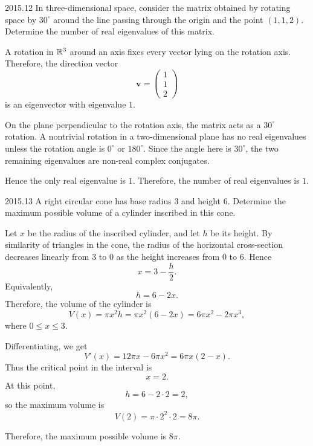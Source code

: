     \begin{pastproblem}{2015.12}
        In three-dimensional space, consider the matrix obtained by rotating space by $30^\circ$
        around the line passing through the origin and the point $(1,1,2)$. Determine the number of
        real eigenvalues of this matrix.
    \end{pastproblem}

    \begin{solution}
        A rotation in $\mathbb{R}^3$ around an axis fixes every vector lying on the rotation axis.
        Therefore, the direction vector
        \[
            \mathbf{v}
            =
            \begin{pmatrix}
                1 \\
                1 \\
                2
            \end{pmatrix}
        \]
        is an eigenvector with eigenvalue $1$.

        On the plane perpendicular to the rotation axis, the matrix acts as a $30^\circ$ rotation. A
        nontrivial rotation in a two-dimensional plane has no real eigenvalues unless the rotation
        angle is $0^\circ$ or $180^\circ$. Since the angle here is $30^\circ$, the two remaining
        eigenvalues are non-real complex conjugates.

        Hence the only real eigenvalue is $1$. Therefore, the number of real eigenvalues is
        $\boxed{1}$.
    \end{solution}

    \begin{pastproblem}{2015.13}
        A right circular cone has base radius $3$ and height $6$. Determine the maximum possible
        volume of a cylinder inscribed in this cone.
    \end{pastproblem}

    \begin{solution}
        Let $x$ be the radius of the inscribed cylinder, and let $h$ be its height. By similarity of
        triangles in the cone, the radius of the horizontal cross-section decreases linearly from
        $3$ to $0$ as the height increases from $0$ to $6$. Hence
        \[
            x=3-\frac{h}{2}.
        \]
        Equivalently,
        \[
            h=6-2x.
        \]
        Therefore, the volume of the cylinder is
        \[
            V(x)
            =
            \pi x^2h
            =
            \pi x^2(6-2x)
            =
            6\pi x^2-2\pi x^3,
        \]
        where $0\leq x\leq 3$.

        Differentiating, we get
        \[
            V'(x)
            =
            12\pi x-6\pi x^2
            =
            6\pi x(2-x).
        \]
        Thus the critical point in the interval is
        \[
            x=2.
        \]
        At this point,
        \[
            h=6-2\cdot 2=2,
        \]
        so the maximum volume is
        \[
            V(2)
            =
            \pi\cdot 2^2\cdot 2
            =
            8\pi.
        \]

        Therefore, the maximum possible volume is $\boxed{8\pi}$.
    \end{solution}


